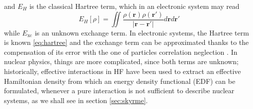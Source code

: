 and $E_H$ is the classical Hartree term, which in an electronic system may read
\begin{equation}
    \label{eq:elec}
    E_H[\rho] = \iint \frac{\rho(\bm r)\rho(\bm r')}{|\bm r-\bm r'|} d\bm r d\bm r'
\end{equation}
while $E_\text{xc}$ is an unknown exchange term. In electronic systems, the Hartree term is known \eqref{eq:hartree} and the exchange term can be approximated thanks to the compensation of its error with the one of particles correlation neglection \cite{Martin2004}. In nuclear physics, things are more complicated, since both terms are unknown; historically, effective interactions in HF have been used to extract an effective Hamiltonian density from which an energy density functional (EDF) can be formulated, whenever a pure interaction is not sufficient to describe nuclear systems, as we shall see in section \ref{sec:skyrme}.